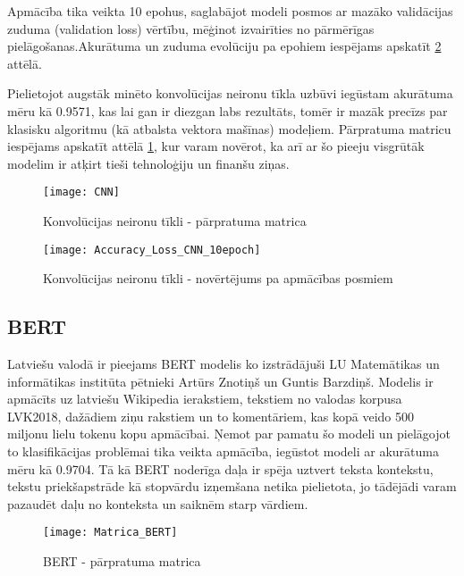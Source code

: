 Apmācība tika veikta 10 epohus, saglabājot modeli posmos ar mazāko validācijas zuduma (validation loss) vērtību, mēģinot izvairīties no pārmērīgas pielāgošanas.Akurātuma un zuduma evolūciju pa epohiem iespējams apskatīt \ref{fig:Accuracy_Loss_CNN_10epoch} attēlā.

Pielietojot augstāk minēto konvolūcijas neironu tīkla uzbūvi iegūstam akurātuma mēru kā 0.9571, kas lai gan ir diezgan labs rezultāts, tomēr ir mazāk precīzs par klasisku algoritmu (kā atbalsta vektora mašīnas) modeļiem. Pārpratuma matricu iespējams apskatīt attēlā \ref{fig:CNN}, kur varam novērot, ka arī ar šo pieeju visgrūtāk modelim ir atķirt tieši tehnoloģiju un finanšu ziņas.

\begin{figure}[H]
	\centering
	\texttt{[image: CNN]}
	\caption{Konvolūcijas neironu tīkli - pārpratuma matrica}
	\label{fig:CNN}
\end{figure}

\begin{figure}[H]
	\texttt{[image: Accuracy\_Loss\_CNN\_10epoch]}
	\caption{Konvolūcijas neironu tīkli - novērtējums pa apmācības posmiem}
	\label{fig:Accuracy_Loss_CNN_10epoch}
\end{figure}

\subsection{BERT}
Latviešu valodā ir pieejams BERT modelis ko izstrādājuši LU Matemātikas un informātikas institūta pētnieki Artūrs Znotiņš un Guntis Barzdiņš. Modelis ir apmācīts uz latviešu Wikipedia ierakstiem, tekstiem no valodas korpusa LVK2018, dažādiem ziņu rakstiem un to komentāriem, kas kopā veido 500 miljonu lielu tokenu kopu apmācībai. Ņemot par pamatu šo modeli un pielāgojot to klasifikācijas problēmai tika veikta apmācība, iegūstot modeli ar akurātuma mēru kā 0.9704.
Tā kā BERT noderīga daļa ir spēja uztvert teksta kontekstu, tekstu priekšapstrāde kā stopvārdu izņemšana netika pielietota, jo tādējādi varam pazaudēt daļu no konteksta un saiknēm starp vārdiem.
\begin{figure}[H]
	\centering
	\texttt{[image: Matrica\_BERT]}
	\caption{BERT - pārpratuma matrica}
	\label{fig:Matrica_BERT}
\end{figure}
